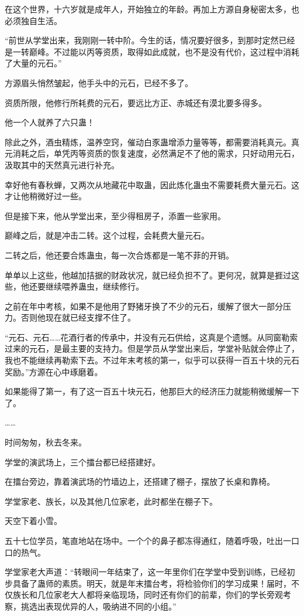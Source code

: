 \begin{this_body}
在这个世界，十六岁就是成年人，开始独立的年龄。再加上方源自身秘密太多，也必须独自生活。

“前世从学堂出来，我刚刚一转中阶。今生的话，情况要好很多，到那时定然已经是一转巅峰。不过能以丙等资质，取得如此成就，也不是没有代价，这过程中消耗了大量的元石。”

方源眉头悄然皱起，他手头中的元石，已经不多了。

资质所限，他修行所耗费的元石，要远比方正、赤城还有漠北要多得多。

他一个人就养了六只蛊！

除此之外，酒虫精炼，温养空窍，催动白豕蛊增添力量等等，都需要消耗真元。真元消耗之后，单凭丙等资质的恢复速度，必然满足不了他的需求，只好动用元石，汲取其中的天然真元进行补充。

幸好他有春秋蝉，又两次从地藏花中取蛊，因此炼化蛊虫不需要耗费大量元石。这才让他稍微好过一些。

但是接下来，他从学堂出来，至少得租房子，添置一些家用。

巅峰之后，就是冲击二转。这个过程，会耗费大量元石。

二转之后，他还要合炼蛊虫，每一次合炼都是一笔不菲的开销。

单单以上这些，他越加拮据的财政状况，就已经负担不了。更何况，就算是捱过这些，他还要继续喂养蛊虫，继续修行。

之前在年中考核，如果不是他用了野猪牙换了不少的元石，缓解了很大一部分压力。否则他现在就已经支撑不住了。

“元石、元石……花酒行者的传承中，并没有元石供给，这真是个遗憾。从同窗勒索过来的元石，是最主要的支持力。但是学员从学堂出来后，学堂补贴就会停止了，我也不能继续再勒索下去。不过年末考核的第一，似乎可以获得一百五十块的元石奖励。”方源在心中琢磨着。

如果能得了第一，有了这一百五十块元石，他那巨大的经济压力就能稍微缓解一下了。

……

时间匆匆，秋去冬来。

学堂的演武场上，三个擂台都已经搭建好。

在擂台旁边，靠着演武场的竹墙边上，还搭建了棚子，摆放了长桌和靠椅。

学堂家老、族长，以及其他几位家老，此时都坐在棚子下。

天空下着小雪。

五十七位学员，笔直地站在场中。一个个的鼻子都冻得通红，随着呼吸，吐出一口口的热气。

学堂家老大声道：“转眼间一年结束了，这一年里你们在学堂中受到训练，已经初步具备了蛊师的素质。明天，就是年末擂台考，将检验你们的学习成果！届时，不仅族长和几位家老大人都将亲临现场，同时还有你们的前辈，你们的学长旁观考察，挑选出表现优异的人，吸纳进不同的小组。”


\end{this_body}
